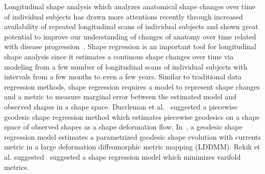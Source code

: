 \documentclass[runningheads,a4paper]{llncs}
\begin{document}
Longitudinal shape analysis which analyzes anatomical shape changes over time of individual subjects has drawn more attentions recently through increased availability of repeated longitudinal scans of individual subjects and shown great potential to improve our understanding of changes of anatomy over time related with disease progression~\cite{Gerig2016}. 
Shape regression is an important tool for longitudinal shape analysis since it estimates a continous shape changes over time via modeling from a few number of longitudinal scans of individual subjects with intervals from a few months to even a few years. 
Similar to traditional data regression methods, shape regression requires a model to represent shape changes and a metric to measure marginal error between the estimated model and observed shapes in a shape space.
Durrleman et al.~\cite{Durrleman2013} suggested a piecewise geodesic shape regression method which estimates piecewise geodesics on a shape space of observed shapes as a shape deformation flow.
In~\cite{Fishbaugh2013}, a geodesic shape regression model estimates a parametrized geodesic shape evolution with currents metric in a large deformation diffeomorphic metric mapping (LDDMM).
Rekik et al. suggested~\cite{Rekik2016} suggested a shape regression model which minimizes varifold metrics. 
\end{document}
